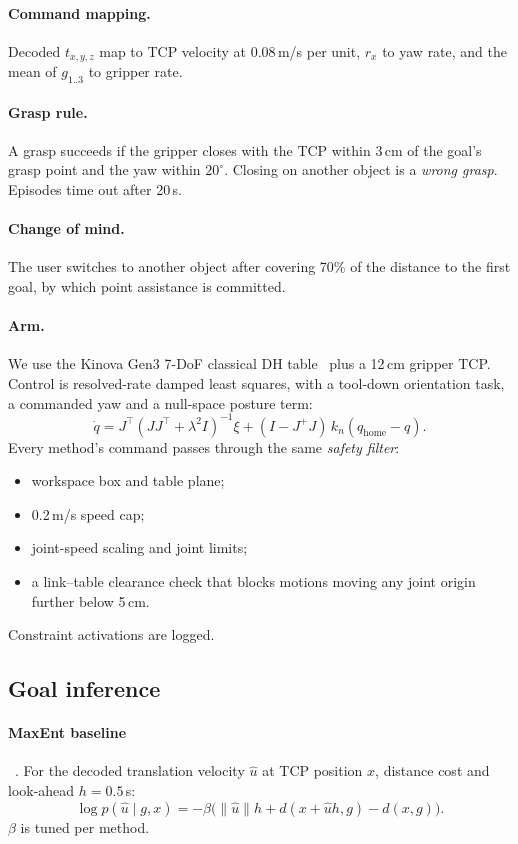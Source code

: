 \paragraph{Command mapping.} Decoded $t_{x,y,z}$ map to TCP velocity at 0.08\,m/s per
unit, $r_x$ to yaw rate, and the mean of $g_{1..3}$ to gripper rate.

\paragraph{Grasp rule.} A grasp succeeds if the gripper closes with the TCP within
3\,cm of the goal's grasp point and the yaw within $20^\circ$. Closing on another
object is a \emph{wrong grasp}. Episodes time out after 20\,s.

\paragraph{Change of mind.} The user switches to another object after covering 70\% of
the distance to the first goal, by which point assistance is committed.

\paragraph{Arm.} We use the Kinova Gen3 7-DoF classical DH table~\cite{kinova2022gen3guide}
plus a 12\,cm gripper TCP. Control is resolved-rate damped least squares, with a
tool-down orientation task, a commanded yaw and a null-space posture term:
\begin{equation}
\dot q=J^\top(JJ^\top+\lambda^2I)^{-1}\xi+(I-J^+J)\,k_n(q_{\text{home}}-q).
\end{equation}
Every method's command passes through the same \emph{safety filter}:
\begin{itemize}
\item workspace box and table plane;
\item 0.2\,m/s speed cap;
\item joint-speed scaling and joint limits;
\item a link--table clearance check that blocks motions moving any joint origin
  further below 5\,cm.
\end{itemize}
Constraint activations are logged.

\subsection{Goal inference}
\paragraph{MaxEnt baseline}~\cite{ziebart2008maximum,dragan2013policy,javdani2015shared}.
For the decoded translation velocity $\hat u$ at TCP position $x$, distance cost and
look-ahead $h=0.5$\,s:
\begin{equation}
\log p(\hat u\mid g,x)=-\beta\big(\|\hat u\|h+d(x{+}\hat uh,g)-d(x,g)\big).
\end{equation}
$\beta$ is tuned per method.

